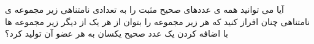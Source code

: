 \exercise
آیا می توانید همه ی عددهای صحیح مثبت را به تعدادی نامتناهی زیر مجموعه ی نامتناهی چنان افراز کنید که هر زیر مجموعه را بتوان از هر یک از دیگر زیر مجموعه ها با اضافه کردن یک عدد صحیح یکسان به هر عضو آن تولید کرد؟